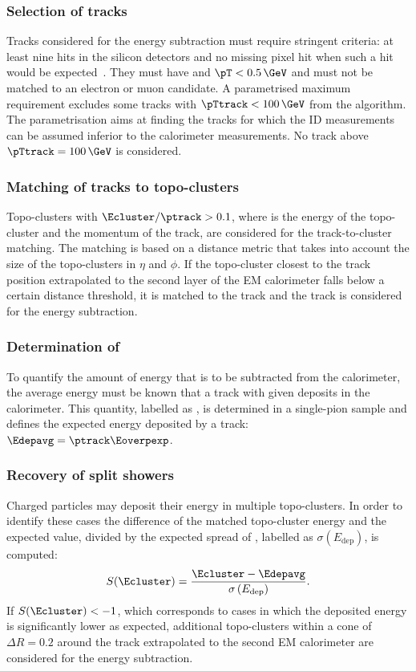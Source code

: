 \subsubsection{Selection of tracks} Tracks considered for the energy subtraction must require stringent criteria: at least nine hits in the silicon detectors and no missing pixel hit when such a hit would be expected~\cite{PERF-2015-09}. They must have  and $\pT < 0.5\,\GeV$ and must not be matched to an electron or muon candidate. A parametrised maximum \pTtrack requirement excludes some tracks with $\pTtrack < 100\,\GeV$ from the algorithm. The parametrisation aims at finding the tracks for which the ID measurements can be assumed inferior to the calorimeter measurements. No track above $\pTtrack = 100\,\GeV$ is considered.

\subsubsection{Matching of tracks to topo-clusters} Topo-clusters with $\Ecluster / \ptrack > 0.1$, where \Ecluster is the energy of the topo-cluster and \ptrack the momentum of the track, are considered for the track-to-cluster matching. The matching is based on a distance metric that takes into account the size of the topo-clusters in $\eta$ and $\phi$. If the topo-cluster closest to the track position extrapolated to the second layer of the EM calorimeter falls below a certain distance threshold, it is matched to the track and the track is considered for the energy subtraction.

\subsubsection{Determination of \Eoverpexp} To quantify the amount of energy that is to be subtracted from the calorimeter, the average energy must be known that a track with given \pT deposits in the calorimeter. This quantity, labelled as \Eoverpexp, is determined in a single-pion sample and defines the expected energy deposited by a track: $\Edepavg = \ptrack \Eoverpexp$.

\subsubsection{Recovery of split showers} Charged particles may deposit their energy in multiple topo-clusters. In order to identify these cases the difference of the matched topo-cluster energy and the expected value, divided by the expected spread of \Edepavg, labelled as $\sigma \left(E_{\text{dep}}\right)$, is computed:
\begin{equation}
    S(\Ecluster) = \frac{ \Ecluster - \Edepavg}{\sigma \left(E_{\text{dep}}\right)}.
\end{equation}
If $S(\Ecluster)  < -1$, which corresponds to cases in which the deposited energy is significantly lower as expected, additional topo-clusters within a cone of $\Delta R = 0.2$ around the track extrapolated to the second EM calorimeter are considered for the energy subtraction.

